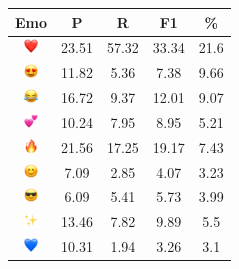 \documentclass{article}
\begin{document}
\begin{table}
\centering
\begin{tabular}{|c|ccc|c|} \hline
\textbf{Emo} & \textbf{P} & \textbf{R} & \textbf{F1} & \textbf{\%} \\ \hline
\includegraphics[height=0.37cm,width=0.37cm]{img/red_heart.png} & 23.51 & 57.32 & 33.34 & 21.6\\ 
\includegraphics[height=0.37cm,width=0.37cm]{img/smiling_face_with_hearteyes.png} & 11.82 & 5.36 & 7.38 & 9.66\\ 
\includegraphics[height=0.37cm,width=0.37cm]{img/face_with_tears_of_joy.png} & 16.72 & 9.37 & 12.01 & 9.07\\ 
\includegraphics[height=0.37cm,width=0.37cm]{img/two_hearts.png} & 10.24 & 7.95 & 8.95 & 5.21\\ 
\includegraphics[height=0.37cm,width=0.37cm]{img/fire.png} & 21.56 & 17.25 & 19.17 & 7.43\\ 
\includegraphics[height=0.37cm,width=0.37cm]{img/smiling_face_with_smiling_eyes.png} & 7.09 & 2.85 & 4.07 & 3.23\\ 
\includegraphics[height=0.37cm,width=0.37cm]{img/smiling_face_with_sunglasses.png} & 6.09 & 5.41 & 5.73 & 3.99\\ 
\includegraphics[height=0.37cm,width=0.37cm]{img/sparkles.png} & 13.46 & 7.82 & 9.89 & 5.5\\ 
\includegraphics[height=0.37cm,width=0.37cm]{img/blue_heart.png} & 10.31 & 1.94 & 3.26 & 3.1\\ 

\end{tabular}
\end{table}
\end{document}
